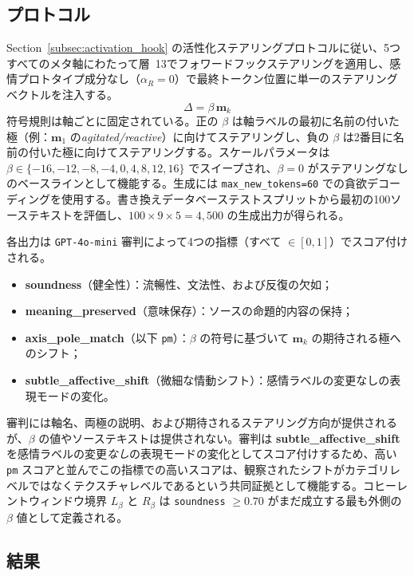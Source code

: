 \subsection{プロトコル}

Section~\ref{subsec:activation_hook} の活性化ステアリングプロトコルに従い、5つすべてのメタ軸にわたって層~13でフォワードフックステアリングを適用し、感情プロトタイプ成分なし（$\alpha_R = 0$）で最終トークン位置に単一のステアリングベクトルを注入する。
\[
\Delta = \beta\,\mathbf{m}_k
\]
符号規則は軸ごとに固定されている。正の $\beta$ は軸ラベルの最初に名前の付いた極（例：$\mathbf{m}_1$ の\textit{agitated/reactive}）に向けてステアリングし、負の $\beta$ は2番目に名前の付いた極に向けてステアリングする。スケールパラメータは $\beta \in \{-16,-12,-8,-4,0,4,8,12,16\}$ でスイープされ、$\beta = 0$ がステアリングなしのベースラインとして機能する。生成には \texttt{max\_new\_tokens=60} での貪欲デコーディングを使用する。書き換えデータベーステストスプリットから最初の100ソーステキストを評価し、$100 \times 9 \times 5 = 4{,}500$ の生成出力が得られる。\par

各出力は \texttt{GPT-4o-mini} 審判によって4つの指標（すべて $\in [0,1]$）でスコア付けされる。
\begin{itemize}
  \item \textbf{soundness}（健全性）：流暢性、文法性、および反復の欠如；
  \item \textbf{meaning\_preserved}（意味保存）：ソースの命題的内容の保持；
  \item \textbf{axis\_pole\_match}（以下 \texttt{pm}）：$\beta$ の符号に基づいて $\mathbf{m}_k$ の期待される極へのシフト；
  \item \textbf{subtle\_affective\_shift}（微細な情動シフト）：感情ラベルの変更なしの表現モードの変化。
\end{itemize}
審判には軸名、両極の説明、および期待されるステアリング方向が提供されるが、$\beta$ の値やソーステキストは提供されない。審判は \textbf{subtle\_affective\_shift} を感情ラベルの変更\textit{なし}の表現モードの変化としてスコア付けするため、高い \texttt{pm} スコアと並んでこの指標での高いスコアは、観察されたシフトがカテゴリレベルではなくテクスチャレベルであるという共同証拠として機能する。コヒーレントウィンドウ境界 $L_\beta$ と $R_\beta$ は \texttt{soundness} $\geq 0.70$ がまだ成立する最も外側の $\beta$ 値として定義される。\par

\subsection{結果}

